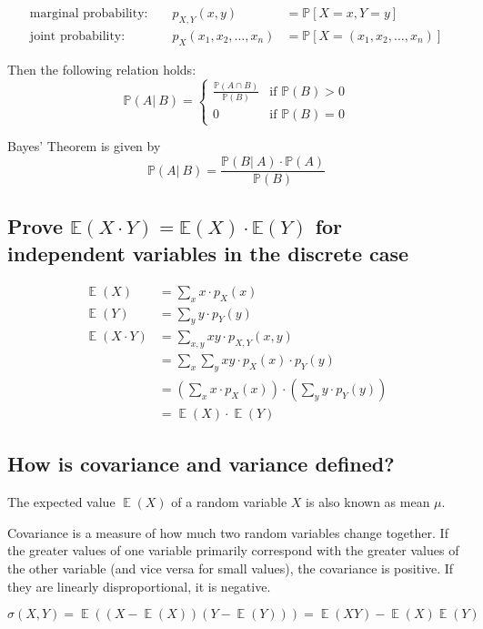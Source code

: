\documentclass[a4paper]{article}
\newcommand\op[2][P]{\mathbb{#1}\left(#2\right)}
\newcommand\os[2][P]{\mathbb{#1}\left[#2\right]}
\newcommand\cond[3][P]{\mathbb{#1}\left(#2 \left|\:#3\right)\right.}
\DeclareMathOperator{\Ex}{\mathbb{E}}
\theoremstyle{definition}
\begin{document}
\begin{align*}
  \text{marginal probability: }   && p_{X,Y}(x, y) &= \os{X=x, Y=y} \\
  \text{joint probability: }      && p_X(x_1, x_2, \ldots, x_n) &= \os{X = (x_1, x_2, \ldots, x_n)}
\end{align*}

Then the following relation holds:
\[
  \cond AB = \begin{cases}
    \frac{\op{A \cap B}}{\op{B}}  & \text{if } \op{B} > 0 \\
    0 & \text{if } \op{B} = 0
  \end{cases}
\]

Bayes' Theorem is given by
\[
  \cond AB = \frac{\cond BA \cdot \op A}{\op B}
\]

\subsection{Prove $\mathbb{E}(X\cdot Y) = \mathbb{E}(X) \cdot \mathbb{E}(Y)$ for independent variables in the discrete case}

\begin{align*}
  \Ex(X)         &= \sum_x x \cdot p_X(x) \\
  \Ex(Y)         &= \sum_y y \cdot p_Y(y) \\
  \Ex(X \cdot Y) &= \sum_{x,y} xy \cdot p_{X,Y}(x,y) \\
                 &= \sum_x \sum_y xy \cdot p_X(x) \cdot p_Y(y) \\
                 &= \left(\sum_x x \cdot p_X(x)\right) \cdot \left(\sum_y y \cdot p_Y(y)\right) \\
                 &= \Ex(X) \cdot \Ex(Y)
\end{align*}

\subsection{How is covariance and variance defined?}

The expected value $\Ex(X)$ of a random variable $X$ is also known as mean $\mu$.

Covariance is a measure of how much two random variables change together. If the greater values of one variable primarily correspond with the greater values of the other variable (and vice versa for small values), the covariance is positive. If they are linearly disproportional, it is negative.

\[ \sigma(X, Y) = \Ex((X - \Ex(X))(Y - \Ex(Y))) = \Ex(XY) - \Ex(X) \Ex(Y) \]
\end{document}
